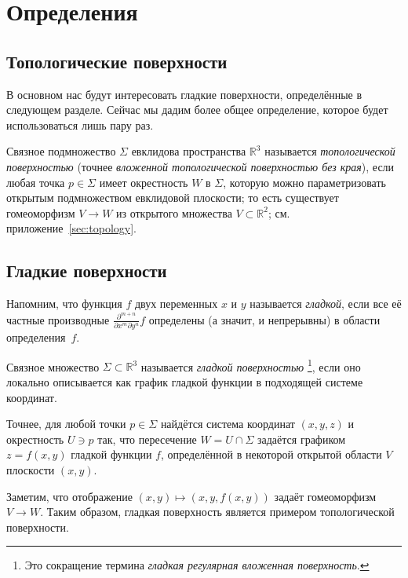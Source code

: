 \chapter{Определения}
\label{chap:surfaces-def}

\section{Топологические поверхности}

В основном нас будут интересовать гладкие поверхности, определённые в следующем разделе.
Сейчас мы дадим более общее определение, которое будет использоваться лишь пару раз.

Связное подмножество $\Sigma$ евклидова пространства $\mathbb{R}^3$
называется \emph{топологической поверхностью} (точнее {}\emph{вложенной топологической поверхностью без края}),
если любая точка $p\in \Sigma$ имеет окрестность $W$ в $\Sigma$,
которую можно параметризовать открытым подмножеством евклидовой плоскости;
то есть существует гомеоморфизм $V\to W$ из открытого множества $V\subset \mathbb{R}^2$; см. приложение~\ref{sec:topology}.

\section{Гладкие поверхности}\label{sec:def-smooth-surface}

Напомним, что функция $f$ двух переменных $x$ и $y$ называется \emph{гладкой}, если все её частные производные $\frac{\partial^{m+n}}{\partial x^m\partial y^n}f$ определены (а значит, и непрерывны) в области определения~$f$.

{\sloppy

Связное множество $\Sigma \subset \mathbb{R}^3$ называется \emph{гладкой поверхностью}%
\footnote{Это сокращение термина {}\emph{гладкая регулярная вложенная поверхность}.}, если оно локально описывается как график гладкой функции в подходящей системе координат.

Точнее, для любой точки $p\in \Sigma$ найдётся система координат $(x,y,z)$ и окрестность $U\ni p$ так, что
пересечение $W=U\cap \Sigma$ задаётся графиком $z=f(x,y)$ гладкой функции $f$, определённой в некоторой открытой области $V$ плоскости $(x,y)$.

}

Заметим, что отображение $(x,y)\mapsto (x,y,f(x,y))$ задаёт гомеоморфизм $V\to W$.
Таким образом, гладкая поверхность является примером топологической поверхности.


